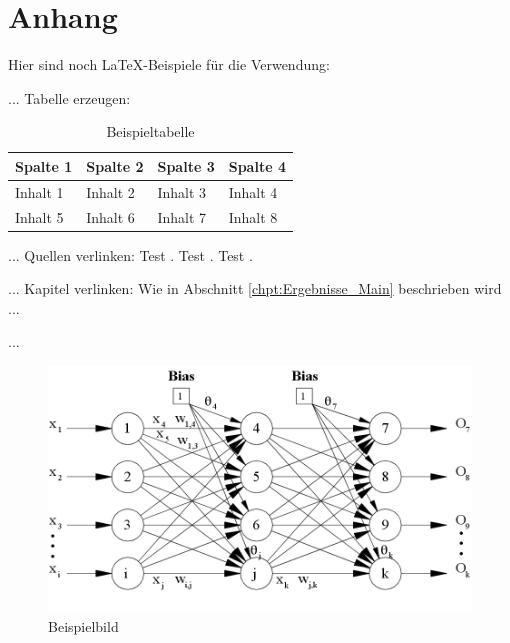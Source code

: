 \chapter{Anhang} \label{chpt:Anhang_Main}


Hier sind noch \LaTeX-Beispiele für die Verwendung: 

...
\newline
\newline
Tabelle erzeugen: 
\begin{table}[htbp]
	\centering
	\caption{Beispieltabelle}
	\begin{tabularx}{\textwidth}{|X|X|X|X|}
		\hline
		Spalte 1 & Spalte 2 & Spalte 3 & Spalte 4 \\
		\hline
		Inhalt 1 & Inhalt 2 & Inhalt 3 & Inhalt 4 \\
		\hline
		Inhalt 5 & Inhalt 6 & Inhalt 7 & Inhalt 8 \\
		\hline
	\end{tabularx}
\end{table}

...
\newline
\newline
Quellen verlinken: 
Test \cite{Bar-Shalom}.
Test \cite{Goldhammer}.
Test \cite{WHO-2004}.

...
\newline
\newline
Kapitel verlinken: 
Wie in Abschnitt \ref{chpt:Ergebnisse_Main} beschrieben wird ...

...
\newline
\newline
\begin{figure}[ht]
	\centering
	\includegraphics[scale=0.40]{Bilder/Neural_Network.jpg}
	\caption{Beispielbild}
	\label{fig: Neural_Network_Fig}
\end{figure}



